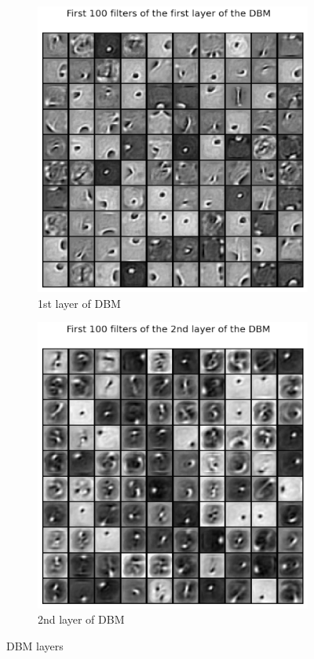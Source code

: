 \documentclass{article}
\begin{document}
\begin{figure}[h!]
\begin{subfigure}[b]{.49\textwidth}
  \centering
  \includegraphics[width=.6\linewidth]{lab4/dbmfinal1.pdf}
  \caption{1st layer of DBM}
  \label{fig:1stdbm}
\end{subfigure}
\hfill
\begin{subfigure}[b]{.49\textwidth}
  \centering
  \includegraphics[width=.6\linewidth]{lab4/dbmfinal2.pdf}
  \caption{2nd layer of DBM}
  \label{fig:2nddbm}
\end{subfigure}
\caption{DBM layers}
\label{fig:dbmlayers}
\end{figure}
\end{document}
